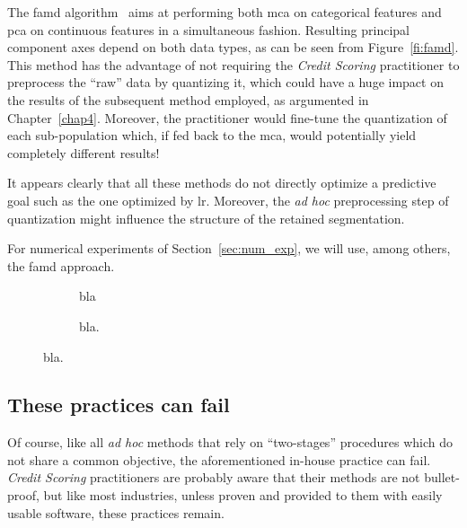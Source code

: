 The \gls{famd} algorithm~\cite{pages2014multiple} aims at performing both \gls{mca} on categorical features and \gls{pca} on continuous features in a simultaneous fashion. Resulting principal component axes depend on both data types, as can be seen from Figure~\ref{fi:famd}.
This method has the advantage of not requiring the \textit{Credit Scoring} practitioner to preprocess the ``raw'' data by quantizing it, which could have a huge impact on the results of the subsequent method employed, as argumented in Chapter~\ref{chap4}. Moreover, the practitioner would fine-tune the quantization of each sub-population which, if fed back to the \gls{mca}, would potentially yield completely different results!

It appears clearly that all these methods do not directly optimize a predictive goal such as the one optimized by \gls{lr}. Moreover, the \textit{ad hoc} preprocessing step of quantization might influence the structure of the retained segmentation. 

For numerical experiments of Section~\ref{sec:num_exp}, we will use, among others, the \gls{famd} approach.

\begin{figure}[!htb]
{\setlength{\parindent}{0cm}}

\begin{multicols}{2}
\centering
\begin{subfigure}[t]{0.45\textwidth}
\centering
\resizebox{\textwidth}{!}{}
\caption{\label{fig:famd1} bla}
\end{subfigure}%
\columnbreak
\hspace*{1cm} \begin{subfigure}[t]{0.45\textwidth}
\centering
\resizebox{\textwidth}{!}{}
\caption{\label{fig:famd2} bla.}
\end{subfigure}
\end{multicols}

\caption{\label{fig:famd} bla.}
\end{figure}

\subsection{These practices can fail}

Of course, like all \textit{ad hoc} methods that rely on ``two-stages'' procedures which do not share a common objective, the aforementioned in-house practice can fail. \textit{Credit Scoring} practitioners are probably aware that their methods are not bullet-proof, but like most industries, unless proven and provided to them with easily usable software, these practices remain.

